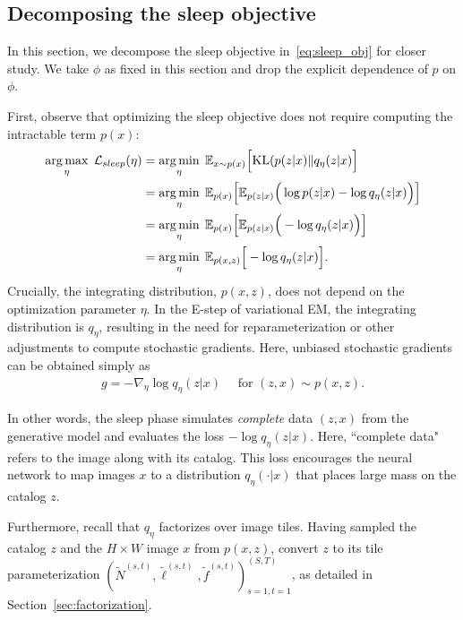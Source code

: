 \subsection{Decomposing the sleep objective}
\label{sec:sleep_details}
In this section, we decompose the sleep objective in~\eqref{eq:sleep_obj} for closer study. 
We take $\phi$ as fixed in this section and drop the explicit dependence of $p$ on $\phi$.

First, observe that optimizing the sleep objective does not require computing the intractable term $p(x)$:
\begin{align}
\operatorname*{arg\,max}_\eta\; \mathcal{L}_{sleep}(\eta)
    & = \operatorname*{arg\,min}_{\eta} \; \mathbb{E}_{x \sim p(x)}\Big[ \mathrm{KL}(p(z | x) \| q_\eta(z | x)\Big] \\
  &=\operatorname*{arg\,min}_{\eta} \; \mathbb E_{p(x)}\Big[\mathbb E_{p(z | x)}\Big(\log p(z | x) - \log q_\eta(z | x) \Big)\Big]\\
&=\operatorname*{arg\,min}_{\eta} \; \mathbb E_{p(x)}\Big[\mathbb E_{p(z | x)}\Big( - \log q_\eta(z | x) \Big)\Big]\\
&=\operatorname*{arg\,min}_{\eta} \; \mathbb E_{p(x, z)}\Big[- \log q_\eta(z | x) \Big]\label{eq:sleep_loss_simple}.
\end{align}
Crucially, the integrating distribution, $p(x,z)$, does not depend on the optimization parameter $\eta$.
In the E-step of variational EM, the integrating distribution is $q_\eta$, resulting in the need for reparameterization or other adjustments to compute stochastic gradients. 
Here, unbiased stochastic gradients can be obtained simply as 
\begin{align}
    g = -\nabla_\eta \log q_\eta(z | x) \quad \text{ for } (z, x)\sim p(x, z).
\end{align}

In other words, the sleep phase simulates {\itshape complete} data $(z, x)$ from the generative model and evaluates the loss $-\log q_\eta(z | x)$. 
Here, ``complete data" refers to the image along with its catalog. 
This loss encourages the neural network to map images $x$ to a distribution $q_{\eta}(\cdot | x)$ that places large mass on the catalog $z$.

Furthermore, recall that $q_\eta$ factorizes over image tiles. Having sampled the catalog $z$ 
and the $H\times W$ image $x$ from $p(x,z)$, convert $z$ to its tile parameterization $(\tilde N^{(s,t)}, \tilde \ell^{(s,t)}, \tilde f^{(s,t)})_{s=1,t=1}^{(S,T)}$, as detailed in Section~\ref{sec:factorization}.

